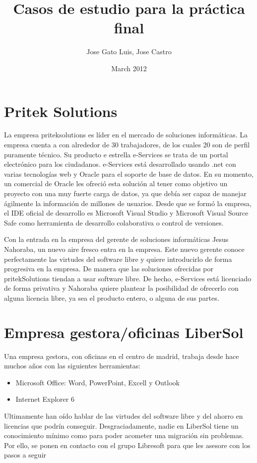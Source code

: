 \documentclass[a4paper]{article}
\title{\textbf{Casos de estudio para la práctica final}}
\author{Jose Gato Luis, Jose Castro}
\date{March 2012}
\begin{document}
 \section{Pritek Solutions}
La empresa priteksolutions es líder en el mercado de soluciones informáticas. La empresa cuenta
a
con alrededor de 30 trabajadores, de los cuales 20 son de perfil puramente técnico. Su producto
e
estrella e-Services se trata de un portal electrónico para los ciudadanos. e-Services está desarrollado usando .net con varias tecnologías web y Oracle para el soporte de base de datos. En su momento, un comercial de Oracle les ofreció esta solución al tener como objetivo un proyecto con una muy fuerte carga de datos, ya que debía ser capaz de manejar ágilmente la información de millones de usuarios. Desde que se formó la empresa, el IDE oficial de desarrollo es Microsoft Visual Studio y Microsoft Visual Source Safe como herramienta de desarrollo colaborativa o control de versiones.

Con la entrada en la empresa del gerente de soluciones informáticas Jesus Nahoraba, un nuevo aire fresco entra en la empresa. Este nuevo gerente conoce perfectamente las virtudes del software libre y quiere introducirlo de forma progresiva en la empresa. De manera que las soluciones ofrecidas por pritekSolutions tiendan a usar software libre. De hecho, e-Services está
licenciado de forma privativa y Nahoraba quiere plantear la posibilidad de ofrecerlo con alguna licencia libre, ya sea el producto entero, o alguna de sus partes.


\section{Empresa gestora/oficinas LiberSol}

Una empresa gestora, con oficinas en el centro de madrid, trabaja desde hace muchos años con
las siguientes herramientas:
\begin{itemize}
\item Microsoft Office: Word, PowerPoint, Excell y Outlook
\item Internet Explorer 6
\end{itemize}

Ultimamente han oído hablar de las virtudes del software libre y del ahorro en licencias que podrín conseguir. Desgraciadamente, nadie en LiberSol tiene un conocimiento mínimo como
para poder acometer una migración sin problemas. Por ello, se ponen en contacto con el grupo
Libresoft para que les asesore con los pasos a seguir
 
\end{document}
